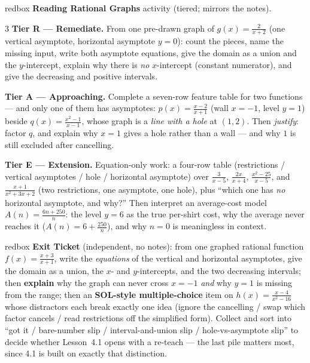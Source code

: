 \documentclass[10pt]{article}
\begin{document}
\begin{skillbox}{redbox}
\textbf{Reading Rational Graphs} activity (tiered; mirrors the notes).
\begin{multicols}{3}
\textbf{Tier R --- Remediate.} From one pre-drawn graph of $g(x)=\frac{2}{x+2}$ (one vertical
asymptote, horizontal asymptote $y=0$): count the pieces, name the missing input, write both asymptote
equations, give the domain as a union and the $y$-intercept, explain why there is \emph{no}
$x$-intercept (constant numerator), and give the decreasing and positive intervals.

\columnbreak
\textbf{Tier A --- Approaching.} Complete a seven-row feature table for two functions --- and only one
of them has asymptotes: $p(x)=\frac{x-2}{x+1}$ (wall $x=-1$, level $y=1$) beside
$q(x)=\frac{x^2-1}{x-1}$, whose graph is a \emph{line with a hole} at $(1,2)$. Then \emph{justify}:
factor $q$, and explain why $x=1$ gives a hole rather than a wall --- and why $1$ is still excluded
after cancelling.

\columnbreak
\textbf{Tier E --- Extension.} Equation-only work: a four-row table (restrictions / vertical asymptotes
/ hole / horizontal asymptote) over $\frac{3}{x-5}$, $\frac{2x}{x+4}$, $\frac{x^2-25}{x-5}$, and
$\frac{x+1}{x^2+3x+2}$ (two restrictions, one asymptote, one hole), plus ``which one has \emph{no}
horizontal asymptote, and why?'' Then interpret an average-cost model
$A(n)=\frac{6n+250}{n}$: the level $y=6$ as the true per-shirt cost, why the average never reaches it
($A(n)=6+\frac{250}{n}$), and why $n=0$ is meaningless in context.
\end{multicols}
\end{skillbox}

\begin{skillbox}{redbox}
\textbf{Exit Ticket} (independent, no notes): from one graphed rational function
$f(x)=\frac{x+3}{x+1}$, write the \emph{equations} of the vertical and horizontal asymptotes, give the
domain as a union, the $x$- and $y$-intercepts, and the two decreasing intervals; then \textbf{explain}
why the graph can never cross $x=-1$ \emph{and} why $y=1$ is missing from the range; then an
\textbf{SOL-style multiple-choice} item on $h(x)=\frac{x-4}{x^2-16}$ whose distractors each break
exactly one idea (ignore the cancelling / swap which factor cancels / read restrictions off the
simplified form). Collect and sort into ``got it / bare-number slip / interval-and-union slip /
hole-vs-asymptote slip'' to decide whether Lesson~4.1 opens with a re-teach --- the last pile matters
most, since 4.1 is built on exactly that distinction.
\end{skillbox}
\end{document}
